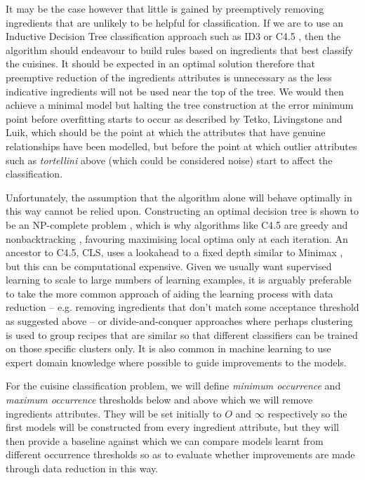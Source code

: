\documentclass[11pt,a4paper]{article}
\begin{document}
It may be the case however that little is gained by preemptively removing
ingredients that are unlikely to be helpful for classification. If we are to use an Inductive
Decision Tree classification approach such as ID3 \cite{quinlan1986induction}
or C4.5 \cite{quinlan1993c4}, then the algorithm should endeavour to build
rules based on ingredients that best classify the cuisines. It should be expected
in an optimal solution therefore that preemptive reduction of the ingredients
attributes is unnecessary as the less indicative ingredients will not be used
near the top of the tree. We would then achieve a minimal model but halting
the tree construction at the error minimum point before overfitting starts
to occur as described by Tetko, Livingstone and Luik, \cite{tetko1995neural}
which should be the point at which the attributes that have genuine relationships
have been modelled, but before the point at which outlier attributes such as
\emph{tortellini} above (which could be considered noise) start to affect the
classification.

Unfortunately, the assumption that the algorithm alone will behave optimally in this
way cannot be relied upon. Constructing an optimal decision tree is shown to be
an NP-complete problem \cite{hyafil1976constructing}, which is why algorithms
like C4.5 are greedy and nonbacktracking \cite{quinlan1993c4}, favouring
maximising local optima only at each iteration. An ancestor to C4.5, CLS,
uses a lookahead to a fixed depth similar to Minimax \cite{quinlan1986induction},
but this can be computational expensive. Given we usually want supervised
learning to scale to large numbers of learning examples, it is arguably preferable
to take the more common approach of aiding the learning process with
data reduction -- e.g. removing ingredients that don't match some acceptance threshold
as suggested above -- or divide-and-conquer approaches where perhaps clustering is
used to group recipes that are similar so that different classifiers can be
trained on those specific clusters only. It is also common in machine learning
to use expert domain knowledge where possible to guide improvements to the
models.

For the cuisine classification problem, we will define \emph{minimum occurrence}
and \emph{maximum occurrence} thresholds below and above which we will remove
ingredients attributes. They will be set initially to $O$ and $\infty$
respectively so the first models will be constructed from every ingredient
attribute, but they will then provide a baseline against which we can compare
models learnt from different occurrence thresholds so as to evaluate whether
improvements are made through data reduction in this way.
\end{document}
